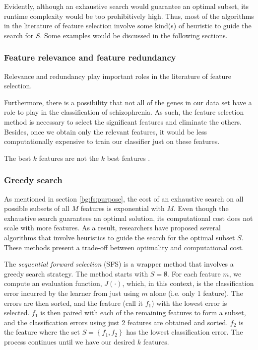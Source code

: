 \documentclass[12pt, twoside, a4paper]{article}
\begin{document}
Evidently, although an exhaustive search would guarantee an optimal subset, its runtime complexity would be too prohibitively high. Thus, most of the algorithms in the literature of feature selection involve some kind(s) of heuristic to guide the search for $S$. Some examples would be discussed in the following sections.

\subsubsection{Feature relevance and feature redundancy} \label{bg:fs:relevance}

Relevance and redundancy play important roles in the literature of feature selection.




Furthermore, there is a possibility that not all of the genes in our data set have a role to play in the classification of schizophrenia. As such, the feature selection method is necessary to select the significant features and eliminate the others. Besides, once we obtain only the relevant features, it would be less computationally expensive to train our classifier just on these features.

The best $k$ features are not the $k$ best features \cite{RefWorks:182}.

\subsubsection{Greedy search}

As mentioned in section \ref{bg:fs:purpose}, the cost of an exhaustive search on all possible subsets of all $M$ features is exponential with $M$. Even though the exhaustive search guarantees an optimal solution, its computational cost does not scale with more features. As a result, researchers have proposed several algorithms that involve heuristics to guide the search for the optimal subset $S$. These methods present a trade-off between optimality and computational cost.

The \textit{sequential forward selection} (SFS) \cite{RefWorks:177} is a wrapper method that involves a greedy search strategy. The method starts with $S=\emptyset$. For each feature $m$, we compute an evaluation function, $J(\cdot)$, which, in this context, is the classification error incurred by the learner from just using $m$ alone (i.e. only 1 feature). The errors are then sorted, and the feature (call it $f_1$) with the lowest error is selected. $f_1$ is then paired with each of the remaining features to form a subset, and the classification errors using just 2 features are obtained and sorted. $f_2$ is the feature where the set $S= \left\lbrace f_1, f_2 \right\rbrace$ has the lowest classification error. The process continues until we have our desired $k$ features.
  
\end{document}
